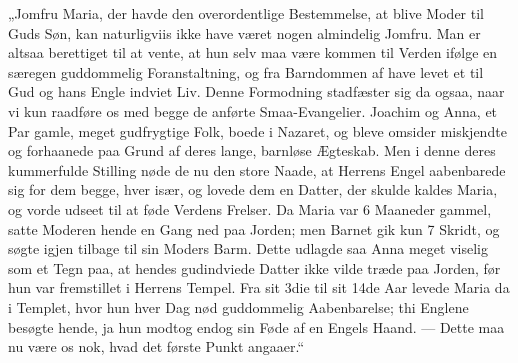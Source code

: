 \documentclass[12pt,a4paper]{book}
\begin{document}
„Jomfru Maria, der havde den overordentlige Bestemmelse, at blive Moder til
Guds Søn, kan naturligviis ikke have været nogen almindelig Jomfru. Man er
altsaa berettiget til at vente, at hun selv maa være kommen til Verden ifølge
en særegen guddommelig Foranstaltning, og fra Barndommen af have levet et til
Gud og hans Engle indviet Liv. Denne Formodning stadfæster sig da ogsaa, naar
vi kun raadføre os med begge de anførte Smaa-Evangelier. Joachim og Anna, et
Par gamle, meget gudfrygtige Folk, boede i Nazaret, og bleve omsider
miskjendte og forhaanede paa Grund af deres lange, barnløse Ægteskab. Men i
denne deres kummerfulde Stilling nøde de nu den store Naade, at Herrens Engel
aabenbarede sig for dem begge, hver især, og lovede dem en Datter, der skulde
kaldes Maria, og vorde udseet til at føde Verdens Frelser. Da Maria var 6
Maaneder gammel,
satte Moderen hende en Gang ned paa Jorden; men Barnet gik kun 7 Skridt, og
søgte igjen tilbage til sin Moders Barm. Dette udlagde saa Anna meget viselig
som et Tegn paa, at hendes gudindviede Datter ikke vilde træde paa Jorden,
før hun var fremstillet i Herrens Tempel. Fra sit 3die til sit 14de Aar
levede Maria da i Templet, hvor hun hver Dag nød guddommelig Aabenbarelse;
thi Englene besøgte hende, ja hun modtog endog sin Føde af en Engels Haand.
--- Dette maa nu være os nok, hvad det første Punkt angaaer.“
\end{document}
